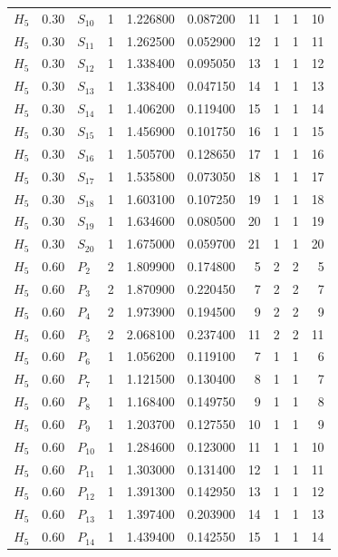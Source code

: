 \begin{longtable}{lrlrrrrrrr}
$H_5$ & 0.30 & $S_{10}$ & 1 & 1.226800 & 0.087200 & 11 & 1 & 1 & 10\\
$H_5$ & 0.30 & $S_{11}$ & 1 & 1.262500 & 0.052900 & 12 & 1 & 1 & 11\\
$H_5$ & 0.30 & $S_{12}$ & 1 & 1.338400 & 0.095050 & 13 & 1 & 1 & 12\\
$H_5$ & 0.30 & $S_{13}$ & 1 & 1.338400 & 0.047150 & 14 & 1 & 1 & 13\\
$H_5$ & 0.30 & $S_{14}$ & 1 & 1.406200 & 0.119400 & 15 & 1 & 1 & 14\\
$H_5$ & 0.30 & $S_{15}$ & 1 & 1.456900 & 0.101750 & 16 & 1 & 1 & 15\\
$H_5$ & 0.30 & $S_{16}$ & 1 & 1.505700 & 0.128650 & 17 & 1 & 1 & 16\\
$H_5$ & 0.30 & $S_{17}$ & 1 & 1.535800 & 0.073050 & 18 & 1 & 1 & 17\\
$H_5$ & 0.30 & $S_{18}$ & 1 & 1.603100 & 0.107250 & 19 & 1 & 1 & 18\\
$H_5$ & 0.30 & $S_{19}$ & 1 & 1.634600 & 0.080500 & 20 & 1 & 1 & 19\\
$H_5$ & 0.30 & $S_{20}$ & 1 & 1.675000 & 0.059700 & 21 & 1 & 1 & 20\\
$H_5$ & 0.60 & $P_{2}$ & 2 & 1.809900 & 0.174800 & 5 & 2 & 2 & 5\\
$H_5$ & 0.60 & $P_{3}$ & 2 & 1.870900 & 0.220450 & 7 & 2 & 2 & 7\\
$H_5$ & 0.60 & $P_{4}$ & 2 & 1.973900 & 0.194500 & 9 & 2 & 2 & 9\\
$H_5$ & 0.60 & $P_{5}$ & 2 & 2.068100 & 0.237400 & 11 & 2 & 2 & 11\\
$H_5$ & 0.60 & $P_{6}$ & 1 & 1.056200 & 0.119100 & 7 & 1 & 1 & 6\\
$H_5$ & 0.60 & $P_{7}$ & 1 & 1.121500 & 0.130400 & 8 & 1 & 1 & 7\\
$H_5$ & 0.60 & $P_{8}$ & 1 & 1.168400 & 0.149750 & 9 & 1 & 1 & 8\\
$H_5$ & 0.60 & $P_{9}$ & 1 & 1.203700 & 0.127550 & 10 & 1 & 1 & 9\\
$H_5$ & 0.60 & $P_{10}$ & 1 & 1.284600 & 0.123000 & 11 & 1 & 1 & 10\\
$H_5$ & 0.60 & $P_{11}$ & 1 & 1.303000 & 0.131400 & 12 & 1 & 1 & 11\\
$H_5$ & 0.60 & $P_{12}$ & 1 & 1.391300 & 0.142950 & 13 & 1 & 1 & 12\\
$H_5$ & 0.60 & $P_{13}$ & 1 & 1.397400 & 0.203900 & 14 & 1 & 1 & 13\\
$H_5$ & 0.60 & $P_{14}$ & 1 & 1.439400 & 0.142550 & 15 & 1 & 1 & 14\\

\end{longtable}
